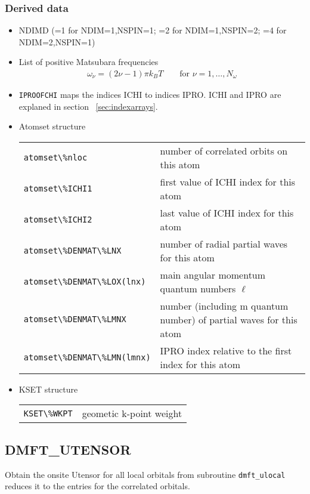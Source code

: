\documentclass[11pt,a4paper]{report}
\begin{document}
\subsubsection{Derived data}
\begin{itemize}
\item NDIMD (=1 for NDIM=1,NSPIN=1; =2 for NDIM=1,NSPIN=2; =4 for
  NDIM=2,NSPIN=1)
\item List of positive Matsubara frequencies
\begin{eqnarray}
\omega_\nu=(2\nu-1)\pi k_BT \qquad\text{for $\nu=1,\ldots,N_\omega$}
\end{eqnarray}
\item \verb|IPROOFCHI| maps the indices ICHI to indices IPRO. ICHI and
  IPRO are explaned in section ~\ref{sec:indexarrays}.
\item Atomset structure
\begin{center}
 \begin{tabular}{ll}
 \verb|atomset\%nloc| & number of correlated orbits on this atom \\
\verb|atomset\%ICHI1| & first value of ICHI index for this atom\\
\verb|atomset\%ICHI2| & last value of ICHI index for this atom\\
\verb|atomset\%DENMAT\%LNX| & number of radial partial waves  for this atom\\
\verb|atomset\%DENMAT\%LOX(lnx)| 
     & main angular momentum quantum numbers $\ell$\\
\verb|atomset\%DENMAT\%LMNX| 
     & number (including m quantum number) of partial waves  for this atom\\
\verb|atomset\%DENMAT\%LMN(lmnx)| 
     & IPRO index relative to the first index for this atom\\
\end{tabular}
\end{center}
%
\item KSET structure
\begin{center}
 \begin{tabular}{ll}
 \verb|KSET\%WKPT| & geometic k-point weight\\
\end{tabular}
\end{center}
\end{itemize}

\subsection{DMFT\_UTENSOR}
Obtain the onsite Utensor for all local orbitals from subroutine
\verb|dmft_ulocal| reduces it to the entries for the correlated
orbitals.
\end{document}
